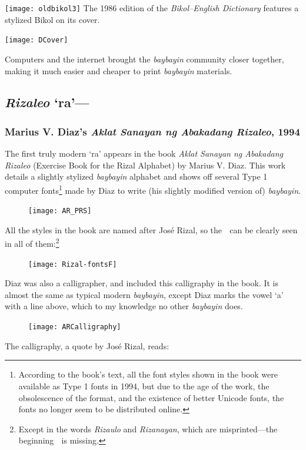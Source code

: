 \documentclass[a4paper,pagesize,openany,14pt,parskip=never]{scrbook}
\newcommand{\≈}{$\approx$}
\begin{document}
\texttt{[image: oldbikol3]}
\newpage
The 1986 edition of the {\em Bikol--English Dictionary} features a stylized Bikol {\baybayinb {}} on its cover.

\texttt{[image: DCover]}
\newpage


Computers and the internet brought the {\em baybayin} community closer together, making it much easier and cheaper to print {\em baybayin} materials. 

\subsection{{\em Rizaleo} `ra'---{\baybayinb {}}}
\subsubsection{Marius V. Diaz's {\em Aklat Sanayan ng Abakadang Rizaleo}, 1994}
The first truly modern `ra' appears in the book {\em Aklat Sanayan ng Abakadang Rizaleo} (Exercise Book for the Rizal Alphabet) by Marius V. Diaz. This work details a slightly stylized {\em baybayin} alphabet and shows off several Type 1 computer fonts\footnote{According to the book's text, all the font styles shown in the book were available as Type 1 fonts in 1994, but due to the age of the work, the obsolescence of the format, and the existence of better Unicode fonts, the fonts no longer seem to be distributed online.} made by Diaz to write (his slightly modified version of) {\em baybayin}.

\begin{figure}[h]
\texttt{[image: AR\_PRS]}
\end{figure}

\newpage
All the styles in the book are named after Jos\'e Rizal, so the {\baybayin ᜍ} can be clearly seen in all of them:\footnote{Except in the words {\em Rizaulo} and {\em Rizanayan}, which are misprinted---the beginning {\baybayin ᜍᜒ} is missing.}

\begin{figure}[H]
\texttt{[image: Rizal-fontsF]}
\end{figure}
\newpage
\label{RizaleoC}
Diaz was also a calligrapher, and included this calligraphy in the book. It is almost the same as typical modern {\em baybayin}, except Diaz marks the vowel `a' with a line above, which to my knowledge no other {\em baybayin} does.

\begin{figure}[H]
\texttt{[image: ARCalligraphy]}
\end{figure}
The calligraphy, a quote by Jos\'e Rizal, reads:
\end{document}

